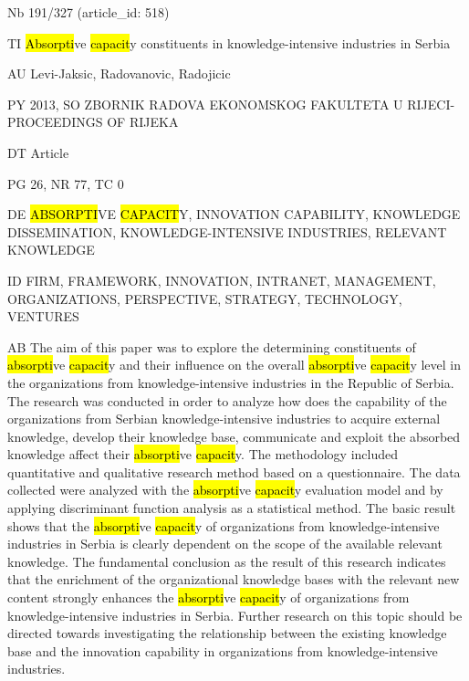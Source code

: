 \documentclass[a4paper]{article}
\begin{document}
\vspace*{-2cm}
Nb \tabto{0cm}191/327 (article\_id: 518)\par
TI \tabto{0cm}\hl{Absorpti}ve \hl{capacit}y constituents in knowledge-intensive industries in Serbia\par
AU \tabto{0cm}Levi-Jaksic, Radovanovic, Radojicic\par
PY \tabto{0cm}2013, SO ZBORNIK RADOVA EKONOMSKOG FAKULTETA U RIJECI-PROCEEDINGS OF RIJEKA\par
DT \tabto{0cm}Article\par
PG \tabto{0cm}26, NR 77, TC 0\par
DE \tabto{0cm}\hl{ABSORPTI}VE \hl{CAPACIT}Y, INNOVATION CAPABILITY, KNOWLEDGE DISSEMINATION, KNOWLEDGE-INTENSIVE INDUSTRIES, RELEVANT KNOWLEDGE\par
ID \tabto{0cm}FIRM, FRAMEWORK, INNOVATION, INTRANET, MANAGEMENT, ORGANIZATIONS, PERSPECTIVE, STRATEGY, TECHNOLOGY, VENTURES\par
AB \tabto{0cm}The aim of this paper was to explore the determining constituents of \hl{absorpti}ve \hl{capacit}y and their influence on the overall \hl{absorpti}ve \hl{capacit}y level in the organizations from knowledge-intensive industries in the Republic of Serbia. The research was conducted in order to analyze how does the capability of the organizations from Serbian knowledge-intensive industries to acquire external knowledge, develop their knowledge base, communicate and exploit the absorbed knowledge affect their \hl{absorpti}ve \hl{capacit}y. The methodology included quantitative and qualitative research method based on a questionnaire. The data collected were analyzed with the \hl{absorpti}ve \hl{capacit}y evaluation model and by applying discriminant function analysis as a statistical method. The basic result shows that the \hl{absorpti}ve \hl{capacit}y of organizations from knowledge-intensive industries in Serbia is clearly dependent on the scope of the available relevant knowledge. The fundamental conclusion as the result of this research indicates that the enrichment of the organizational knowledge bases with the relevant new content strongly enhances the \hl{absorpti}ve \hl{capacit}y of organizations from knowledge-intensive industries in Serbia. Further research on this topic should be directed towards investigating the relationship between the existing knowledge base and the innovation capability in organizations from knowledge-intensive industries.\par
\clearpage
\end{document}
